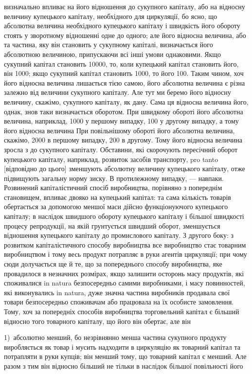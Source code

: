 \parcont{}  %
визначально впливає на його відношення до сукупного капіталу,
або на відносну величину купецького капіталу, необхідного для
циркуляції, бо ясно, що абсолютна величина необхідного купецького
капіталу і швидкість його обороту стоять у зворотному
відношенні одне до одного; але його відносна величина, або та
частина, яку він становить у сукупному капіталі, визначається
його абсолютною величиною, припускаючи всі інші умови
однаковими. Якщо сукупний капітал становить \num{10000}, то, коли
купецький капітал становить  його, він \deq{} 1000; якщо сукупний
капітал становить 1000, то   його \deq{} 100. Таким чином, хоч
його відносна величина лишається тією самою, його абсолютна
величина є різна залежно від величини сукупного капіталу. Але
тут ми беремо його відносну величину, скажімо,   сукупного капіталу,
як дану. Сама ця відносна величина його, однак, знов таки
визначається оборотом. При швидкому обороті його абсолютна величина,
наприклад, \deq{} 1000 у першому випадку,
\deq{} 100 у другому випадку, а тому його відносна величина \deq{} 
При повільнішому обороті його абсолютна величина, скажімо, \deq{}
2000 в першому випадку, \deq{} 200 в другому. Тому його відносна
величина зросла з   до  сукупного капіталу. Обставини,
які скорочують пересічний оборот купецького капіталу, наприклад,
розвиток засобів транспорту, pro tanto [відповідно до цього]
зменшують абсолютну величину купецького капіталу, отже
підвищують загальну норму зиску. В протилежному випадку, —
навпаки. Розвинений капіталістичний спосіб виробництва, порівняно
з попереднім становищем, впливає двояко на купецький
капітал: та сама кількість товарів обертається за допомогою
меншої маси дійсно функціонуючого купецького капіталу; в наслідок
швидшого обороту купецького капіталу і більшої швидкості
процесу репродукції, на якій грунтується швидший оборот,
зменшується відношення купецького капіталу до промислового
капіталу. З другого боку: з розвитком капіталістичного способу
виробництва все виробництво стає товарним виробництвом і тому
весь продукт потрапляє в руки агентів циркуляції; при чому
сюди долучається ще й те, що за попереднього способу виробництва,
яке провадилося в незначних розмірах, якщо залишити
осторонь масу продуктів, які споживалися in natura безпосередньо
самими виробниками, і масу повинностей, які виконувались
in natura, дуже значна частина виробників продавала свої
товари безпосередньо споживачам або працювала на їх особисте
замовлення. Тому, хоч за попередніх способів виробництва торговельний
капітал є більший відносно того товарного капіталу,
що його він обертає, але він

1)~абсолютно менший, бо незрівнянно менша частина сукупного
продукту виробляється як товар і мусить надходити в циркуляцію
як товарний капітал та потрапляти в руки купців; він менший
тому, що товарний капітал є менший. Але разом з тим він відносно
більший не тільки в наслідок більшої повільності його
\parbreak{}  %

